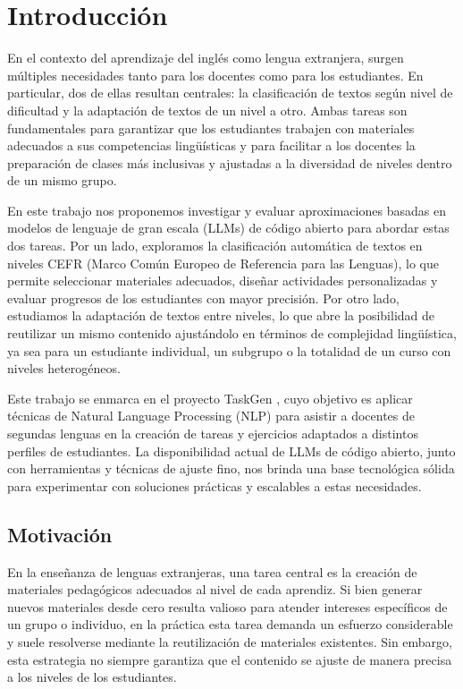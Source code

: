\section{Introducción}
En el contexto del aprendizaje del inglés como lengua extranjera, surgen múltiples necesidades tanto para los docentes como para los estudiantes. En particular, dos de ellas resultan centrales: la clasificación de textos según nivel de dificultad y la adaptación de textos de un nivel a otro. Ambas tareas son fundamentales para garantizar que los estudiantes trabajen con materiales adecuados a sus competencias lingüísticas y para facilitar a los docentes la preparación de clases más inclusivas y ajustadas a la diversidad de niveles dentro de un mismo grupo.

En este trabajo nos proponemos investigar y evaluar aproximaciones basadas en modelos de lenguaje de gran escala (LLMs) de código abierto para abordar estas dos tareas. Por un lado, exploramos la clasificación automática de textos en niveles CEFR (Marco Común Europeo de Referencia para las Lenguas), lo que permite seleccionar materiales adecuados, diseñar actividades personalizadas y evaluar progresos de los estudiantes con mayor precisión. Por otro lado, estudiamos la adaptación de textos entre niveles, lo que abre la posibilidad de reutilizar un mismo contenido ajustándolo en términos de complejidad lingüística, ya sea para un estudiante individual, un subgrupo o la totalidad de un curso con niveles heterogéneos.

Este trabajo se enmarca en el proyecto TaskGen \parencite{Vives2024}, cuyo objetivo es aplicar técnicas de Natural Language Processing (NLP) para asistir a docentes de segundas lenguas en la creación de tareas y ejercicios adaptados a distintos perfiles de estudiantes. La disponibilidad actual de LLMs de código abierto, junto con herramientas y técnicas de ajuste fino, nos brinda una base tecnológica sólida para experimentar con soluciones prácticas y escalables a estas necesidades.

\subsection{Motivación}
En la enseñanza de lenguas extranjeras, una tarea central es la creación de materiales pedagógicos adecuados al nivel de cada aprendiz. Si bien generar nuevos materiales desde cero resulta valioso para atender intereses específicos de un grupo o individuo, en la práctica esta tarea demanda un esfuerzo considerable y suele resolverse mediante la reutilización de materiales existentes. Sin embargo, esta estrategia no siempre garantiza que el contenido se ajuste de manera precisa a los niveles de los estudiantes.

